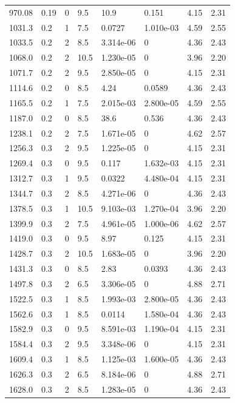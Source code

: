 \documentclass[preview]{standalone}
\begin{document}
{{{\begin{tabular}{L{1.2cm}C{1.2cm} C{0.3cm}C{0.5cm} C{1.4cm}C{1.4cm} C{1.4cm}C{1.4cm}}
  970.08  &  0.19  & 0     & 9.5 &  10.9  & 0.151  & 4.15 &  2.31   \\ 
  1031.3  &   0.2  & 1     & 7.5 &  0.0727  & 1.010e-03  & 4.59 &  2.55   \\ 
  1033.5  &   0.2  & 2     & 8.5 &  3.314e-06  & 0  & 4.36 &  2.43   \\ 
  1068.0  &   0.2  & 2     & 10.5 &  1.230e-05  & 0  & 3.96 &  2.20   \\ 
  1071.7  &   0.2  & 2     & 9.5 &  2.850e-05  & 0  & 4.15 &  2.31   \\ 
  1114.6  &   0.2  & 0     & 8.5 &  4.24  & 0.0589  & 4.36 &  2.43   \\ 
  1165.5  &   0.2  & 1     & 7.5 &  2.015e-03  & 2.800e-05  & 4.59 &  2.55   \\ 
  1187.0  &   0.2  & 0     & 8.5 &  38.6  & 0.536  & 4.36 &  2.43   \\ 
  1238.1  &   0.2  & 2     & 7.5 &  1.671e-05  & 0  & 4.62 &  2.57   \\ 
  1256.3  &   0.3  & 2     & 9.5 &  1.225e-05  & 0  & 4.15 &  2.31   \\ 
  1269.4  &   0.3  & 0     & 9.5 &  0.117  & 1.632e-03  & 4.15 &  2.31   \\ 
  1312.7  &   0.3  & 1     & 9.5 &  0.0322  & 4.480e-04  & 4.15 &  2.31   \\ 
  1344.7  &   0.3  & 2     & 8.5 &  4.271e-06  & 0  & 4.36 &  2.43   \\ 
  1378.5  &   0.3  & 1     & 10.5 &  9.103e-03  & 1.270e-04  & 3.96 &  2.20   \\ 
  1399.9  &   0.3  & 2     & 7.5 &  4.961e-05  & 1.000e-06  & 4.62 &  2.57   \\ 
  1419.0  &   0.3  & 0     & 9.5 &  8.97  & 0.125  & 4.15 &  2.31   \\ 
  1428.7  &   0.3  & 2     & 10.5 &  1.683e-05  & 0  & 3.96 &  2.20   \\ 
  1431.3  &   0.3  & 0     & 8.5 &  2.83  & 0.0393  & 4.36 &  2.43   \\ 
  1497.8  &   0.3  & 2     & 6.5 &  3.306e-05  & 0  & 4.88 &  2.71   \\ 
  1522.5  &   0.3  & 1     & 8.5 &  1.993e-03  & 2.800e-05  & 4.36 &  2.43   \\ 
  1562.6  &   0.3  & 1     & 8.5 &  0.0114  & 1.580e-04  & 4.36 &  2.43   \\ 
  1582.9  &   0.3  & 0     & 9.5 &  8.591e-03  & 1.190e-04  & 4.15 &  2.31   \\ 
  1584.4  &   0.3  & 2     & 9.5 &  3.348e-06  & 0  & 4.15 &  2.31   \\ 
  1609.4  &   0.3  & 1     & 8.5 &  1.125e-03  & 1.600e-05  & 4.36 &  2.43   \\ 
  1626.3  &   0.3  & 2     & 6.5 &  8.184e-06  & 0  & 4.88 &  2.71   \\ 
  1628.0  &   0.3  & 2     & 8.5 &  1.283e-05  & 0  & 4.36 &  2.43   \\ 
\hline 
\end{tabular} 

}}}
\end{document}
